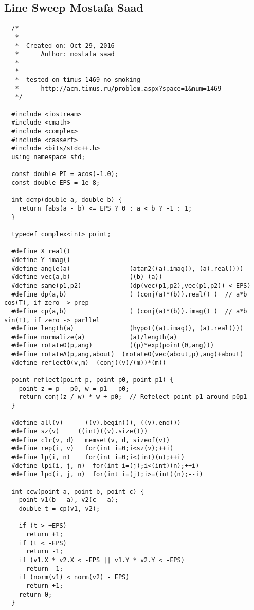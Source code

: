 \documentclass{article}
\begin{document}
\subsection{Line Sweep Mostafa Saad}
\begin{verbatim}
  /*
   *
   *  Created on: Oct 29, 2016
   *      Author: mostafa saad
   *
   *
   *  tested on timus_1469_no_smoking
   *      http://acm.timus.ru/problem.aspx?space=1&num=1469
   */

  #include <iostream>
  #include <cmath>
  #include <complex>
  #include <cassert>
  #include <bits/stdc++.h>
  using namespace std;

  const double PI = acos(-1.0);
  const double EPS = 1e-8;

  int dcmp(double a, double b) {
    return fabs(a - b) <= EPS ? 0 : a < b ? -1 : 1;
  }

  typedef complex<int> point;

  #define X real()
  #define Y imag()
  #define angle(a)                (atan2((a).imag(), (a).real()))
  #define vec(a,b)                ((b)-(a))
  #define same(p1,p2)             (dp(vec(p1,p2),vec(p1,p2)) < EPS)
  #define dp(a,b)                 ( (conj(a)*(b)).real() )  // a*b cos(T), if zero -> prep
  #define cp(a,b)                 ( (conj(a)*(b)).imag() )  // a*b sin(T), if zero -> parllel
  #define length(a)               (hypot((a).imag(), (a).real()))
  #define normalize(a)            (a)/length(a)
  #define rotateO(p,ang)          ((p)*exp(point(0,ang)))
  #define rotateA(p,ang,about)  (rotateO(vec(about,p),ang)+about)
  #define reflectO(v,m)  (conj((v)/(m))*(m))

  point reflect(point p, point p0, point p1) {
    point z = p - p0, w = p1 - p0;
    return conj(z / w) * w + p0;  // Refelect point p1 around p0p1
  }

  #define all(v)      ((v).begin()), ((v).end())
  #define sz(v)     ((int)((v).size()))
  #define clr(v, d)   memset(v, d, sizeof(v))
  #define rep(i, v)   for(int i=0;i<sz(v);++i)
  #define lp(i, n)    for(int i=0;i<(int)(n);++i)
  #define lpi(i, j, n)  for(int i=(j);i<(int)(n);++i)
  #define lpd(i, j, n)  for(int i=(j);i>=(int)(n);--i)

  int ccw(point a, point b, point c) {
    point v1(b - a), v2(c - a);
    double t = cp(v1, v2);

    if (t > +EPS)
      return +1;
    if (t < -EPS)
      return -1;
    if (v1.X * v2.X < -EPS || v1.Y * v2.Y < -EPS)
      return -1;
    if (norm(v1) < norm(v2) - EPS)
      return +1;
    return 0;
  }


\end{verbatim}
\end{document}
